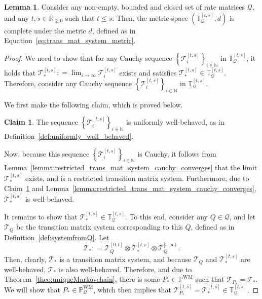 \documentclass[10pt]{paper}
\theoremstyle{definition}
\newtheorem{lemma}[theorem]{Lemma}
\newtheorem{claim}{Claim}[theorem]
\newcommand{\nats}{\mathbb{N}}
\newcommand{\reals}{\mathbb{R}}
\newcommand{\realsnonneg}{\reals_{\geq 0}}
\newcommand{\processes}{\mathbb{P}}
\newcommand{\wmprocesses}{\processes^{\mathrm{WM}}}
\newcommand{\rateset}{\mathcal{Q}}
\newcommand{\coloneqq}{:\!=}
\begin{document}
\begin{lemma}\label{lemma:restricted_trans_mat_system_complete_if_Q_closed}
Consider any non-empty, bounded and closed set of rate matrices $\rateset$, and any $t,s\in\realsnonneg$ such that $t\leq s$. Then, the metric space $(\mathbb{T}_\rateset^{[t,s]},d)$ is complete under the metric $d$, defined as in Equation~\eqref{eq:trans_mat_system_metric}.
\end{lemma}
\begin{proof}
We need to show that for any Cauchy sequence $\left\{\mathcal{T}_i^{[t,s]}\right\}_{i\in\nats}$ in $\mathbb{T}_\rateset^{[t,s]}$, it holds that $\mathcal{T}_*^{[t,s]}\coloneqq\lim_{i\to\infty}\mathcal{T}_i^{[t,s]}$ exists and satisfies $\mathcal{T}_*^{[t,s]}\in\mathbb{T}_\rateset^{[t,s]}$. Therefore, consider any Cauchy sequence $\left\{\mathcal{T}_i^{[t,s]}\right\}_{i\in\nats}$ in  $\mathbb{T}_\rateset^{[t,s]}$. 

We first make the following claim, which is proved below.
\begin{claim}\label{claim:lemma_restricted_trans_mat_system_complete_uniformly_well_behaved}
The sequence $\left\{\mathcal{T}_i^{[t,s]}\right\}_{i\in\nats}$ is uniformly well-behaved, as in Definition~\ref{def:uniformly_well_behaved}.
\end{claim}

Now, because this sequence $\left\{\mathcal{T}_i^{[t,s]}\right\}_{i\in\nats}$ is Cauchy, it follows from Lemma~\ref{lemma:restricted_trans_mat_system_cauchy_converges} that the limit $\mathcal{T}_*^{[t,s]}$ exists, and is a restricted transition matrix system. Furthermore, due to Claim~\ref{claim:lemma_restricted_trans_mat_system_complete_uniformly_well_behaved} and Lemma~\ref{lemma:restricted_trans_mat_system_cauchy_converges}, $\mathcal{T}_*^{[t,s]}$ is well-behaved.

It remains to show that $\mathcal{T}_*^{[t,s]}\in\mathbb{T}_\rateset^{[t,s]}$. To this end, consider any $Q\in\rateset$, and let $\mathcal{T}_Q$ be the transition matrix system corresponding to this $Q$, defined as in Definition~\ref{def:systemfromQ}. Let 
\begin{equation*}
\mathcal{T}_*\coloneqq \mathcal{T}_Q^{[0,t]}\otimes \mathcal{T}_*^{[t,s]} \otimes \mathcal{T}_Q^{[s,\infty)}\,.
\end{equation*}
Then, clearly, $\mathcal{T}_*$ is a transition matrix system, and because $\mathcal{T}_Q$ and $\mathcal{T}_*^{[t,s]}$ are well-behaved, $\mathcal{T}_*$ is also well-behaved. Therefore, and due to Theorem~\ref{theo:uniqueMarkovchain}, there is some $P_*\in\wmprocesses$ such that $\mathcal{T}_{P_*}=\mathcal{T}_*$. We will show that $P_*\in\wmprocesses_\rateset$, which then implies that $\mathcal{T}_{P_*}^{[t,s]}=\mathcal{T}_*^{[t,s]}\in\mathbb{T}_\rateset^{[t,s]}$.


\end{proof}
\end{document}
